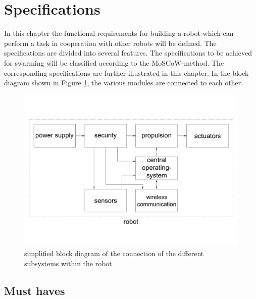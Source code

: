 \documentclass[10pt,a4paper]{article}
\begin{document}
\newpage

\section{Specifications}
In this chapter the functional requirements for building a robot which can perform a task in cooperation with other robots will be defined. The specifications are divided into several features. The specifications to be achieved for swarming will be classified according to the MoSCoW-method. The corresponding specifications are further illustrated in this chapter. In the block diagram shown in Figure  \ref{fig:blockschematic}, the various modules are connected to each other.



\begin{figure}[h]
    \centering
    \includegraphics[width=1\textwidth]{blockschematic}
    \caption{simplified block diagram of the connection of the different subsystems within the robot }
    \label{fig:blockschematic}
\end{figure}



\subsection{Must haves}
\end{document}
